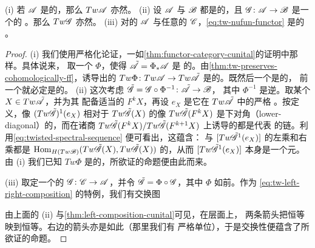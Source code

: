 \begin{lemma}\label{thm:tw-preserves-cunital}
(i) 若 $\mathscr{A}$ 是\trCunital{}的，那么 $Tw\mathscr{A}$ 亦然。
(ii) 设 $\mathscr{A}$ 与 $\mathscr{B}$ 都是\trCunital{}的，且 $\mathscr{G}\colon\mathscr{A}\to\mathscr{B}$
是一个\trCunital{}的 \trAFunctor。那么 $Tw\mathscr{G}$ 亦然。
(iii) 对\trCunital{}的 $\mathscr{A}$ 与任意的 $\mathscr{C}$，\eqref{eq:tw-nufun-functor}
是\trCunital{}的 \trAFunctor。
\end{lemma}
\begin{proof}
(i) 我们使用严格化论证，一如\cref{thm:functor-category-cunital}的证明中那样。具体说来，
取一个\trFormalDiffeomorphism{} $\Phi$，使得 $\tilde{\mathscr{A}}=\Phi_{*}\mathscr{A}$ 是%
\trStrictlyUnital{}的。由\cref{thm:tw-preserves-cohomologically-ff}，诱导出的%
\trNonunital{} \trAFunctor{} $Tw\Phi\colon Tw\mathscr{A}\to Tw\tilde{\mathscr{A}}$
是\trCohomology\trFullyFaithful{}的。既然后一个\trCategory{}是\trStrictlyUnital{}的，
前一个就必定是\trCunital{}的。
(ii) 这次考虑 $\tilde{\mathscr{G}}=\mathscr{G}\circ\Phi^{-1}\colon\tilde{\mathscr{A}}\to\mathscr{B}$，
其中 $\Phi^{-1}$ 是逆\trFormalDiffeomorphism。取某个 $X\in Tw\tilde{\mathscr{A}}$，并为其
配备适当的\trFiltration{} $F^kX$，再设 $e_X$ 是它在 $Tw\tilde{\mathscr{A}}$ 中的严格%
\trIdentityMorphism。按定义，像 $(Tw\tilde{\mathscr{G}})^1(e_X)$ 相对于 $Tw\tilde{\mathscr{G}}(X)$
的像\trFiltration{} $Tw\tilde{\mathscr{G}}(F^kX)$ 是下对角（lower-diagonal）的，而在诸商
$Tw\tilde{\mathscr{G}}(F^kX)/Tw\tilde{\mathscr{G}}(F^{k+1}X)$ 上诱导的\trEndomorphism{}都是代表%
\trIdentityMorphism{}的链。利用\eqref{eq:twisted-spectral-sequence} 便可看出，这蕴含：
与 $[Tw\tilde{\mathscr{G}}^1(e_X)]$ 的左乘和右乘都是
$\operatorname{Hom}_{H(Tw\mathscr{B})}(Tw\tilde{\mathscr{G}}(X),Tw\tilde{\mathscr{G}}(X))$ 的\trAutomorphism，从而
$[Tw\tilde{\mathscr{G}}^1(e_X)]$ 本身是一个\trInvertible{}元。由 (i) 我们已知 $Tw\Phi$
是\trCunital{}的，所欲证的命题便由此而来。

(iii) 取定一个\trNonunital{}的 \trAFunctor{} $\mathscr{G}\colon\mathscr{C}\to\mathscr{A}$，并令
$\tilde{\mathscr{G}}=\Phi\circ\mathscr{G}$，其中 $\Phi$ 如前。作为 \eqref{eq:tw-left-right-composition}
的特例，我们有交换图
{\footnotesize{}}
由上面的 (ii) 与\cref{thm:left-composition-cunital}可见，在\trCohomology{}层面上，
两条\trHorizontal{}箭头把恒等映到恒等。右边的\trVertical{}箭头亦是如此（那里我们有
严格单位），于是交换性便蕴含了所欲证的命题。
\end{proof}

